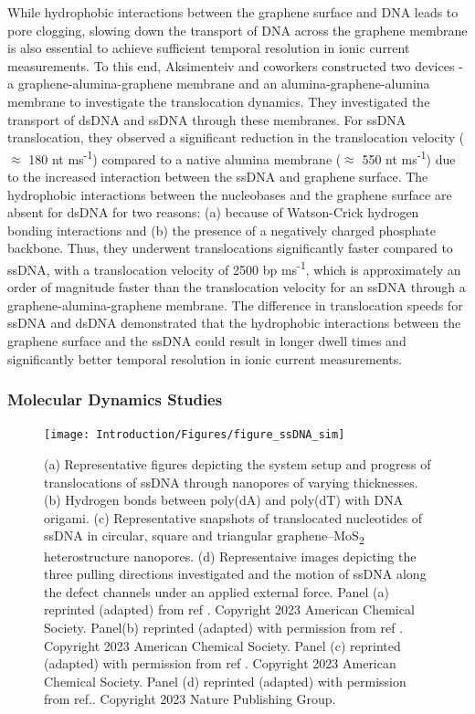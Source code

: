 While hydrophobic interactions between the graphene surface and DNA leads to pore clogging, slowing down the transport of DNA across the graphene membrane is also essential to achieve sufficient temporal resolution in ionic current measurements. To this end, Aksimenteiv and coworkers constructed two devices - a graphene-alumina-graphene membrane and an alumina-graphene-alumina membrane to investigate the translocation dynamics.\supercite{banerjee_slowing_2015} They investigated the transport of dsDNA and ssDNA through these membranes. For ssDNA translocation, they observed a significant reduction in the translocation velocity ($\approx$ 180 nt ms\textsuperscript{-1}) compared to a native alumina membrane ($\approx$ 550 nt ms\textsuperscript{-1}) due to the increased interaction between the ssDNA and graphene surface. The hydrophobic interactions between the nucleobases and the graphene surface are absent for dsDNA for two reasons: (a) because of  Watson-Crick hydrogen bonding interactions and (b) the presence of a negatively charged phosphate backbone. Thus, they underwent translocations significantly faster compared to ssDNA, with a translocation velocity of 2500 bp ms\textsuperscript{-1}, which is approximately an order of magnitude faster than the translocation velocity for an ssDNA through a graphene-alumina-graphene membrane. The difference in translocation speeds for ssDNA and dsDNA demonstrated that the hydrophobic interactions between the graphene surface and the ssDNA could result in longer dwell times and significantly better temporal resolution in ionic current measurements.

\subsubsection{Molecular Dynamics Studies}
\begin{figure}
    \centering
    \texttt{[image: Introduction/Figures/figure\_ssDNA\_sim]}
    \caption[Results from ssDNA - graphene nanopore all-atom MD simulations]{(a) Representative figures depicting the system setup and progress of translocations of ssDNA through nanopores of varying thicknesses. (b) Hydrogen bonds between poly(dA) and poly(dT) with DNA origami. (c) Representative snapshots of translocated nucleotides of ssDNA in circular, square and triangular graphene–MoS\textsubscript{2} heterostructure nanopores.  (d) Representaive images depicting the three pulling directions investigated and the motion of ssDNA along the defect channels under an applied external force. Panel (a) reprinted (adapted) from ref \supercite{wells_assessing_2012}. Copyright 2023 American Chemical Society. Panel(b) reprinted (adapted) with permission from ref \supercite{barati_farimani_dna_2017}. Copyright 2023 American Chemical Society. Panel (c) reprinted (adapted) with permission from ref \supercite{zou_spontaneous_2020}. Copyright 2023 American Chemical Society. Panel (d) reprinted (adapted) with permission from ref.\supercite{shankla_step-defect_2019}. Copyright 2023 Nature Publishing Group.}
    \label{fig:figure16}
\end{figure}

